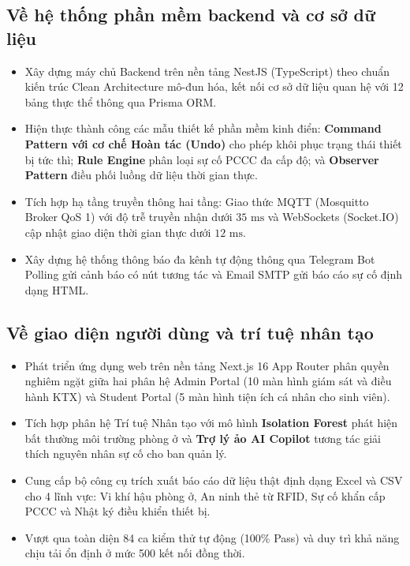 \subsection{Về hệ thống phần mềm backend và cơ sở dữ liệu}
\begin{itemize}
    \item Xây dựng máy chủ Backend trên nền tảng NestJS (TypeScript) theo chuẩn kiến trúc Clean Architecture mô-đun hóa, kết nối cơ sở dữ liệu quan hệ với 12 bảng thực thể thông qua Prisma ORM.
    \item Hiện thực thành công các mẫu thiết kế phần mềm kinh điển: \textbf{Command Pattern với cơ chế Hoàn tác (Undo)} cho phép khôi phục trạng thái thiết bị tức thì; \textbf{Rule Engine} phân loại sự cố PCCC đa cấp độ; và \textbf{Observer Pattern} điều phối luồng dữ liệu thời gian thực.
    \item Tích hợp hạ tầng truyền thông hai tầng: Giao thức MQTT (Mosquitto Broker QoS 1) với độ trễ truyền nhận dưới $35\text{ ms}$ và WebSockets (Socket.IO) cập nhật giao diện thời gian thực dưới $12\text{ ms}$.
    \item Xây dựng hệ thống thông báo đa kênh tự động thông qua Telegram Bot Polling gửi cảnh báo có nút tương tác và Email SMTP gửi báo cáo sự cố định dạng HTML.
\end{itemize}

\subsection{Về giao diện người dùng và trí tuệ nhân tạo}
\begin{itemize}
    \item Phát triển ứng dụng web trên nền tảng Next.js 16 App Router phân quyền nghiêm ngặt giữa hai phân hệ Admin Portal (10 màn hình giám sát và điều hành KTX) và Student Portal (5 màn hình tiện ích cá nhân cho sinh viên).
    \item Tích hợp phân hệ Trí tuệ Nhân tạo với mô hình \textbf{Isolation Forest} phát hiện bất thường môi trường phòng ở và \textbf{Trợ lý ảo AI Copilot} tương tác giải thích nguyên nhân sự cố cho ban quản lý.
    \item Cung cấp bộ công cụ trích xuất báo cáo dữ liệu thật định dạng Excel và CSV cho 4 lĩnh vực: Vi khí hậu phòng ở, An ninh thẻ từ RFID, Sự cố khẩn cấp PCCC và Nhật ký điều khiển thiết bị.
    \item Vượt qua toàn diện 84 ca kiểm thử tự động (100\% Pass) và duy trì khả năng chịu tải ổn định ở mức 500 kết nối đồng thời.
\end{itemize}

